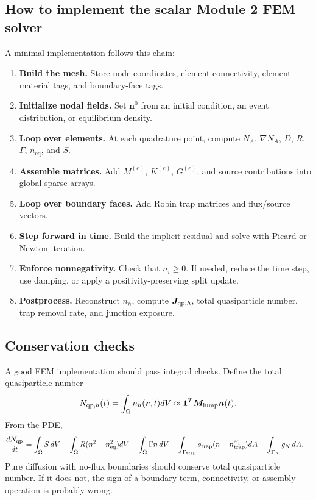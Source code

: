 \documentclass[11pt]{article}
\newcommand{\br}{{\bm{r}}}
\newcommand{\trap}{\mathrm{trap}}
\newcommand{\eq}{\mathrm{eq}}
\begin{document}
\subsection{How to implement the scalar Module 2 FEM solver}
A minimal implementation follows this chain:
\begin{enumerate}[leftmargin=1.6em]
    \item \textbf{Build the mesh.} Store node coordinates, element connectivity, element material tags, and boundary-face tags.
    \item \textbf{Initialize nodal fields.} Set $\bm{n}^0$ from an initial condition, an event distribution, or equilibrium density.
    \item \textbf{Loop over elements.} At each quadrature point, compute $N_A$, $\nabla N_A$, $D$, $R$, $\Gamma$, $n_{\eq}$, and $S$.
    \item \textbf{Assemble matrices.} Add $M^{(e)}$, $K^{(e)}$, $G^{(e)}$, and source contributions into global sparse arrays.
    \item \textbf{Loop over boundary faces.} Add Robin trap matrices and flux/source vectors.
    \item \textbf{Step forward in time.} Build the implicit residual and solve with Picard or Newton iteration.
    \item \textbf{Enforce nonnegativity.} Check that $n_i\ge0$. If needed, reduce the time step, use damping, or apply a positivity-preserving split update.
    \item \textbf{Postprocess.} Reconstruct $n_h$, compute $\bm{J}_{\mathrm{qp},h}$, total quasiparticle number, trap removal rate, and junction exposure.
\end{enumerate}

\subsection{Conservation checks}
A good FEM implementation should pass integral checks. Define the total quasiparticle number
\begin{equation}
N_{\qp,h}(t)=\int_{\Omega}n_h(\br,t)dV\approx\bm{1}^T\bm{M}_{\mathrm{lump}}\bm{n}(t).
\end{equation}
From the PDE,
\begin{align}
\frac{dN_{\qp}}{dt}
&=\int_{\Omega}S\,dV
-\int_{\Omega}R(n^2-n_{\eq}^2)dV
-\int_{\Omega}\Gamma n\,dV
-\int_{\Gamma_{\trap}}s_{\trap}(n-n_{\trap}^{\eq})dA
-\int_{\Gamma_N}g_N\,dA.
\end{align}
Pure diffusion with no-flux boundaries should conserve total quasiparticle number. If it does not, the sign of a boundary term, connectivity, or assembly operation is probably wrong.
\end{document}
